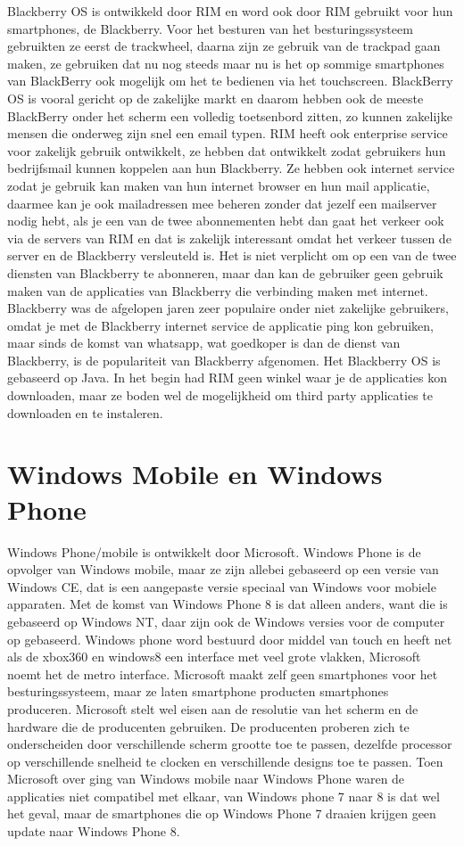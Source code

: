 Blackberry OS is ontwikkeld door RIM en word ook door RIM gebruikt voor hun smartphones, de Blackberry. Voor het besturen van het besturingssysteem gebruikten ze eerst de trackwheel, daarna zijn ze gebruik van de trackpad gaan maken, ze gebruiken dat nu nog steeds maar nu is het op sommige smartphones van BlackBerry ook mogelijk om het te bedienen via het touchscreen. BlackBerry OS is vooral gericht op de zakelijke markt en daarom hebben ook de meeste BlackBerry onder het scherm een volledig toetsenbord zitten, zo kunnen zakelijke mensen die onderweg zijn snel een email typen. RIM heeft ook enterprise service voor zakelijk gebruik ontwikkelt, ze hebben dat ontwikkelt zodat gebruikers hun bedrijfsmail kunnen koppelen aan hun Blackberry. Ze hebben ook internet service zodat je gebruik kan maken van hun internet browser en hun mail applicatie, daarmee kan je ook mailadressen mee beheren zonder dat jezelf een mailserver nodig hebt, als je een van de twee abonnementen hebt dan gaat het verkeer ook via de servers van RIM en dat is zakelijk interessant omdat het verkeer tussen de server en de Blackberry versleuteld is. Het is niet verplicht om op een van de twee diensten van Blackberry te abonneren, maar dan kan de gebruiker geen gebruik maken van de applicaties van Blackberry die verbinding maken met internet. Blackberry was de afgelopen jaren zeer populaire onder niet zakelijke gebruikers, omdat je met de Blackberry internet service de applicatie ping kon gebruiken, maar sinds de komst van whatsapp, wat goedkoper is dan de dienst van Blackberry, is de populariteit van Blackberry afgenomen. Het Blackberry OS is gebaseerd op Java. In het begin had RIM geen winkel waar je de applicaties kon downloaden, maar ze boden wel de mogelijkheid om third party applicaties te downloaden en te instaleren.

\section{Windows Mobile en Windows Phone}

Windows Phone/mobile is ontwikkelt door Microsoft. Windows Phone is de opvolger van Windows mobile, maar ze zijn allebei gebaseerd op een versie van Windows CE, dat is een aangepaste versie speciaal van Windows voor mobiele apparaten. Met de komst van Windows Phone 8 is dat alleen anders, want die is gebaseerd op Windows NT, daar zijn ook de Windows versies voor de computer op gebaseerd. Windows phone word bestuurd door middel van touch en heeft net als de xbox360 en windows8 een interface met veel grote vlakken, Microsoft noemt het de metro interface. Microsoft maakt zelf geen smartphones voor het besturingssysteem, maar ze laten smartphone producten smartphones produceren. Microsoft stelt wel eisen aan de resolutie van het scherm en de hardware die de producenten gebruiken. De producenten proberen zich te onderscheiden door verschillende scherm grootte toe te passen, dezelfde processor op verschillende snelheid te clocken en verschillende designs toe te passen. Toen Microsoft over ging van Windows mobile naar Windows Phone waren de applicaties niet compatibel met elkaar, van Windows phone 7 naar 8 is dat wel het geval, maar de smartphones die op Windows Phone 7 draaien krijgen geen update naar Windows Phone 8.
 
 
